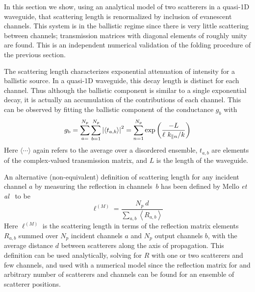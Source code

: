 In this section we show, using an analytical model of two scatterers in a quasi-1D waveguide, that scattering length is renormalized by inclusion of evanescent channels. This system is in the ballistic regime since there is very little scattering between channels; transmission matrices with diagonal elements of roughly unity are found. This is an independent numerical validation of the folding procedure of the previous section.


The scattering length characterizes exponential attenuation of intensity for a ballistic source. In a quasi-1D waveguide, this decay length is distinct for each channel. Thus although the ballistic component is similar to a single exponential decay, it is actually an accumulation of the contributions of each channel. This can be observed by fitting the ballistic component of the conductance $g_b$ with 
\begin{equation}
g_{\rm b}= \sum_{a=}^{N_p}\sum_{b=1}^{N_p} \left| \langle t_{a,b} \rangle \right|^2 = \sum_{n=1}^{N_p} \exp\left(\frac{-L}{\ell \ k_{\parallel n}/k} \right)
\label{eq:gb_lscat}
\end{equation}
Here $\langle \cdots \rangle$ again refers to the average over a disordered ensemble, $t_{a,b}$ are elements of the complex-valued transmission matrix, and $L$ is the length of the waveguide.


An alternative (non-equivalent) definition of scattering length for any incident channel $a$ by measuring the reflection in channels~$b$ has been defined by Mello \textit{et al}~\cite{2007_Froufe-Perez_PhysA} to be
\begin{equation}
 \ell^{(M)} = \frac{N_p\ d}{\sum_{a,b} \left\langle R_{a,b} \right\rangle}
\label{eq:l_scat_mello_numerical}
\end{equation}
Here $\ell^{(M)}$ is the scattering length in terms of the reflection matrix elements $R_{a,b}$ summed over $N_p$ incident channels $a$ and $N_p$ output channels $b$, with the average distance $d$ between scatterers along the axis of propagation.
This definition can be used analytically, solving for $R$ with one or two scatterers and few channels, and used with a numerical model since the reflection matrix for and arbitrary number of scatterers and channels can be found for an ensemble of scatterer positions. 


